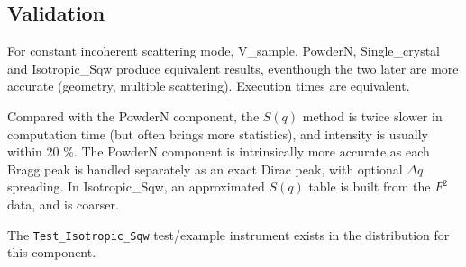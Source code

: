 \subsection{Validation}
For constant incoherent scattering mode, V\_sample, PowderN, Single\_crystal and Isotropic\_Sqw produce equivalent results, eventhough the two later are more accurate (geometry, multiple scattering). Execution times are equivalent.

Compared with the PowderN component, the $S(q)$ method is twice slower in computation time (but often brings more statistics), and intensity is usually within 20 \%. The PowderN component is intrinsically more accurate as each Bragg peak is handled separately as an exact Dirac peak, with optional $\Delta q$ spreading. In Isotropic\_Sqw, an approximated $S(q)$ table is built from the $F^2$ data, and is coarser.

The \verb+Test_Isotropic_Sqw+ test/example instrument exists in the distribution for this component.




